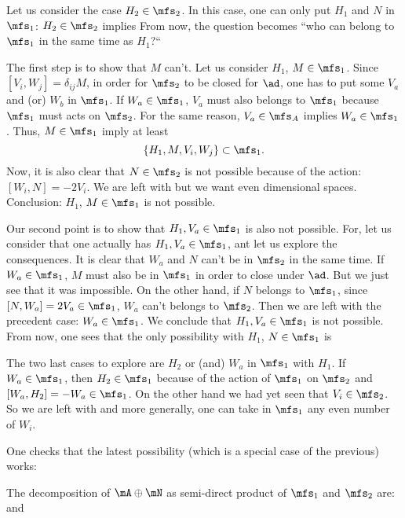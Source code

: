 Let us consider the case $H_2\in\mfs_2$. In this case, one can only put $H_1$ and $N$ in $\mfs_1$: $H_2\in\mfs_2$ implies
From now, the question becomes ``who can belong to $\mfs_1$ in the same time as $H_1$?``

The first step is to show that $M$ can't. Let us consider $H_1$, $M\in\mfs_1$. Since $[V_i,W_j]=\delta_{ij}M$, in order for $\mfs_2$ to be closed for $\ad$, one has to put some $V_a$ and (or) $W_b$ in $\mfs_1$. If $W_a\in\mfs_1$, $V_a$ must also belongs to $\mfs_1$ because $\mfs_1$ must acts on $\mfs_2$. For the same reason, $V_a\in\mfs_A$ implies $W_a\in\mfs_1$. Thus, $M\in\mfs_1$ imply at least
 \[
    \{H_1,M,V_i,W_j\}\subset \mfs_1.
 \]
Now, it is also clear that $N\in\mfs_2$ is not possible because of the action: $[W_i,N]=-2V_i$. We are left with
but we want even dimensional spaces. Conclusion: $H_1$, $M\in\mfs_1$ is not possible.

Our second point is to show that $H_1,V_a\in\mfs_1$ is also not possible. For, let us consider that one actually has $H_1,V_a\in\mfs_1$, ant let us explore the consequences. It is clear that $W_a$ and $N$ can't be in $\mfs_2$ in the same time. If $W_a\in\mfs_1$, $M$ must also be in $\mfs_1$ in order to close under $\ad$. But we just see that it was impossible. On the other hand, if $N$ belongs to $\mfs_1$, since $[N,W_a]=2V_a\in\mfs_1$, $W_a$ can't belongs to $\mfs_2$. Then we are left with the precedent case: $W_a\in\mfs_1$. We conclude that $H_1,V_a\in\mfs_1$ is not possible.
From now, one sees that the only possibility with $H_1$, $N\in\mfs_1$ is

The two last cases to explore are $H_2$ or (and)  $W_a$ in $\mfs_1$ with $H_1$. If $W_a\in\mfs_1$, then $H_2\in\mfs_1$ because of the action of $\mfs_1$ on $\mfs_2$ and $[W_a,H_2]=-W_a\in\mfs_1$. On the other hand we had yet seen that $V_i\in\mfs_2$. So we are left with
and more generally, one can take in $\mfs_1$ any even number of $W_i$.

One checks that the latest possibility (which is a special case of the previous) works:

The decomposition of $\mA\oplus\mN$ as semi-direct product of $\mfs_1$ and $\mfs_2$ are:
and


